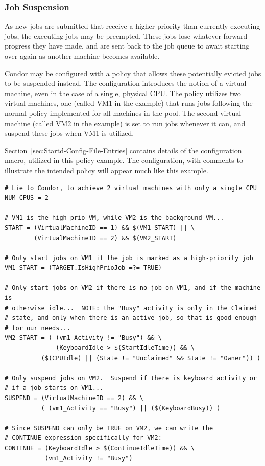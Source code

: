 \subsubsection{\label{sec:Job-Suspension}Job Suspension}
As new jobs are submitted that receive a higher priority than
currently executing jobs,
the executing jobs may be preempted.
These jobs lose whatever forward progress they have made,
and are sent back to the job queue to await starting over again as
another machine becomes available.

Condor may be configured with a policy that allows these potentially
evicted jobs to be suspended instead.
The configuration introduces the notion of a virtual machine,
even in the case of a single, physical CPU.
The policy utilizes two virtual machines,
one (called VM1 in the example) that runs jobs following
the normal policy implemented for all machines in the pool.
The second virtual machine (called VM2 in the example) is 
set to run jobs whenever it can, and suspend these jobs
when VM1 is utilized.

Section~\ref{sec:Startd-Config-File-Entries} contains details of
the  configuration macro,
utilized in this policy example.
The configuration, with comments to illustrate the intended policy
will appear much like this example.

\footnotesize
\begin{verbatim}
# Lie to Condor, to achieve 2 virtual machines with only a single CPU
NUM_CPUS = 2

# VM1 is the high-prio VM, while VM2 is the background VM...
START = (VirtualMachineID == 1) && $(VM1_START) || \
        (VirtualMachineID == 2) && $(VM2_START)

# Only start jobs on VM1 if the job is marked as a high-priority job 
VM1_START = (TARGET.IsHighPrioJob =?= TRUE)

# Only start jobs on VM2 if there is no job on VM1, and if the machine is
# otherwise idle...  NOTE: the "Busy" activity is only in the Claimed
# state, and only when there is an active job, so that is good enough
# for our needs...
VM2_START = ( (vm1_Activity != "Busy") && \ 
              (KeyboardIdle > $(StartIdleTime)) && \
	      ($(CPUIdle) || (State != "Unclaimed" && State != "Owner")) )

# Only suspend jobs on VM2.  Suspend if there is keyboard activity or
# if a job starts on VM1...
SUSPEND = (VirtualMachineID == 2) && \
          ( (vm1_Activity == "Busy") || ($(KeyboardBusy)) )

# Since SUSPEND can only be TRUE on VM2, we can write the
# CONTINUE expression specifically for VM2:
CONTINUE = (KeyboardIdle > $(ContinueIdleTime)) && \
           (vm1_Activity != "Busy")

\end{verbatim}
\normalsize

